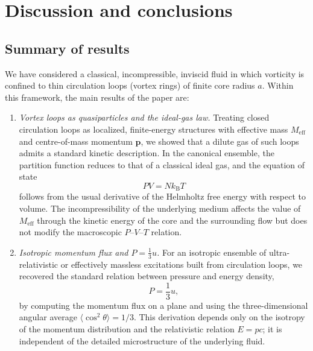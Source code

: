 \documentclass[11pt]{article}
\begin{document}
    \section{Discussion and conclusions}
        \label{sec:discussion}

        \subsection{Summary of results}

            We have considered a classical, incompressible, inviscid fluid in which vorticity is
            confined to thin circulation loops (vortex rings) of finite core radius $a$. Within
            this framework, the main results of the paper are:

            \begin{enumerate}
                \item \emph{Vortex loops as quasiparticles and the ideal-gas law.}
                Treating closed circulation loops as localized, finite-energy structures with
                effective mass $M_{\mathrm{eff}}$ and centre-of-mass momentum $\boldsymbol{p}$,
                we showed that a dilute gas of such loops admits a standard kinetic description.
                In the canonical ensemble, the partition function reduces to that of a classical
                ideal gas, and the equation of state
                \begin{equation}
                    P V = N k_{\mathrm B} T
                \end{equation}
                follows from the usual derivative of the Helmholtz free energy with respect
                to volume. The incompressibility of the underlying medium affects the value of
                $M_{\mathrm{eff}}$ through the kinetic energy of the core and the surrounding
                flow but does not modify the macroscopic $P$--$V$--$T$ relation.

                \item \emph{Isotropic momentum flux and $P = \tfrac{1}{3}u$.}
                For an isotropic ensemble of ultra-relativistic or effectively massless
                excitations built from circulation loops, we recovered the standard relation
                between pressure and energy density,
                \begin{equation}
                    P = \frac{1}{3} u,
                \end{equation}
                by computing the momentum flux on a plane and using the three-dimensional
                angular average $\langle \cos^2\theta \rangle = 1/3$. This derivation depends
                only on the isotropy of the momentum distribution and the relativistic
                relation $E = pc$; it is independent of the detailed microstructure of the
                underlying fluid.


\end{enumerate}
\end{document}
